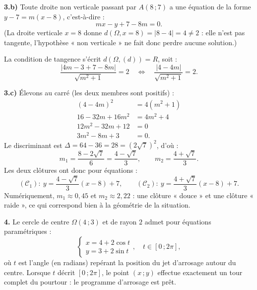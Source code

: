 \documentclass[11pt]{article}
\begin{document}
\begin{exoresolu}
\textbf{3.b)} Toute droite non verticale passant par $A(8\,;7)$ a une équation de la forme $y - 7 = m(x-8)$, c'est-à-dire :
\[ mx - y + 7 - 8m = 0. \]
(La droite verticale $x = 8$ donne $d(\Omega, x=8) = |8-4| = 4 \neq 2$ : elle n'est pas tangente, l'hypothèse « non verticale » ne fait donc perdre aucune solution.)

La condition de tangence s'écrit $d(\Omega, (d)) = R$, soit :
\[ \frac{|4m - 3 + 7 - 8m|}{\sqrt{m^2+1}} = 2
\quad\Longleftrightarrow\quad
\frac{|4 - 4m|}{\sqrt{m^2+1}} = 2. \]

\textbf{3.c)} Élevons au carré (les deux membres sont positifs) :
\begin{align*}
(4-4m)^2 &= 4(m^2+1) \\
16 - 32m + 16m^2 &= 4m^2 + 4 \\
12m^2 - 32m + 12 &= 0 \\
3m^2 - 8m + 3 &= 0.
\end{align*}
Le discriminant est $\Delta = 64 - 36 = 28 = (2\sqrt{7})^2$, d'où :
\[ m_1 = \frac{8 - 2\sqrt{7}}{6} = \frac{4-\sqrt{7}}{3}, \qquad m_2 = \frac{4+\sqrt{7}}{3}. \]
Les deux clôtures ont donc pour équations :
\[ (\mathscr{C}_1) : \ y = \frac{4-\sqrt{7}}{3}(x-8) + 7, \qquad (\mathscr{C}_2) : \ y = \frac{4+\sqrt{7}}{3}(x-8) + 7. \]
Numériquement, $m_1 \approx 0{,}45$ et $m_2 \approx 2{,}22$ : une clôture « douce » et une clôture « raide », ce qui correspond bien à la géométrie de la situation.

\textbf{4.} Le cercle de centre $\Omega(4\,;3)$ et de rayon $2$ admet pour équations paramétriques :
\[ \begin{cases} x = 4 + 2\cos t \\ y = 3 + 2\sin t \end{cases}, \quad t \in [0\,;2\pi], \]
où $t$ est l'angle (en radians) repérant la position du jet d'arrosage autour du centre. Lorsque $t$ décrit $[0\,;2\pi]$, le point $(x\,;y)$ effectue exactement un tour complet du pourtour : le programme d'arrosage est prêt.
\end{exoresolu}
\end{document}
